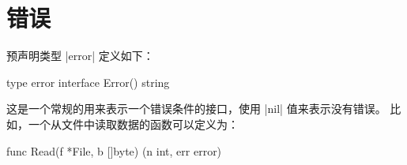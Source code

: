 \chapter{错误} \label{ch:errors}
预声明类型 \code|error| 定义如下：
\begin{golang}
type error interface {
	Error() string
}
\end{golang}
这是一个常规的用来表示一个错误条件的接口，使用 \code|nil| 值来表示没有错误。
比如，一个从文件中读取数据的函数可以定义为：
\begin{golang}
func Read(f *File, b []byte) (n int, err error)
\end{golang}